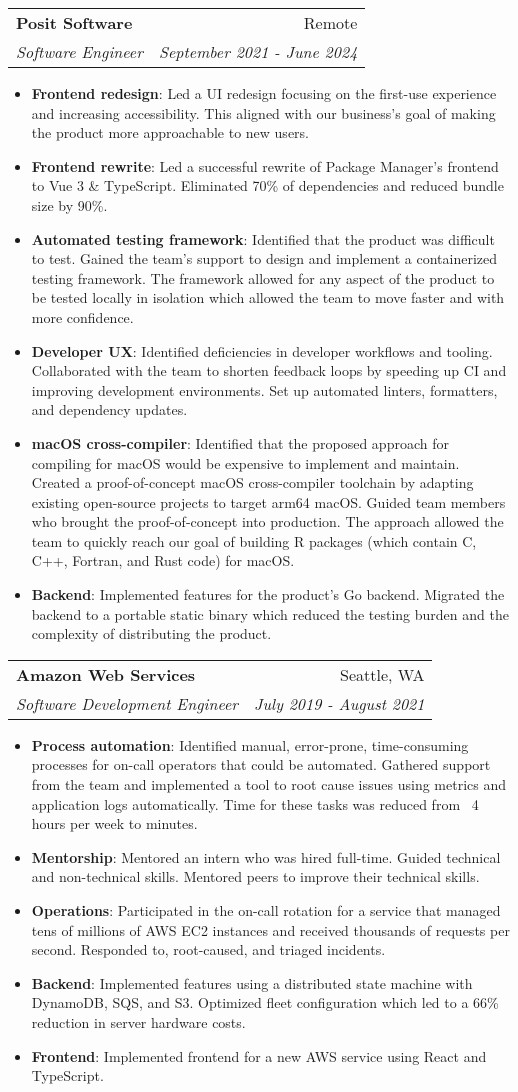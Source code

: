 \documentclass[letterpaper,11pt]{article}
\makeatletter
\newcommand{\resumeItem}[2]{
  \item\small{
    \textbf{#1}{: #2 \vspace{-2pt}}
  }
}
\newcommand{\resumeSubheading}[4]{
  \vspace{-1pt}\item
    \begin{tabular*}{0.97\textwidth}[t]{l@{\extracolsep{\fill}}r}
      \textbf{#1} & #2 \\
      \textit{\small#3} & \textit{\small #4} \\
    \end{tabular*}\vspace{-5pt}
}
\newcommand{\resumeItemListStart}{\begin{itemize}}
\newcommand{\resumeItemListEnd}{\end{itemize}\vspace{-5pt}}
\makeatother
\begin{document}
    \resumeSubheading
      {Posit Software}{Remote}
      {Software Engineer}{September 2021 - June 2024}
      \resumeItemListStart
        \resumeItem{Frontend redesign}{Led a UI redesign focusing on the first-use experience and increasing accessibility. This aligned with our business's goal of making the product more approachable to new users.}
        \resumeItem{Frontend rewrite}{Led a successful rewrite of Package Manager's frontend to Vue 3 \& TypeScript. Eliminated 70\% of dependencies and reduced bundle size by 90\%.}
        \resumeItem{Automated testing framework}{Identified that the product was difficult to test. Gained the team's support to design and implement a containerized testing framework. The framework allowed for any aspect of the product to be tested locally in isolation which allowed the team to move faster and with more confidence.}
        \resumeItem{Developer UX}{Identified deficiencies in developer workflows and tooling. Collaborated with the team to shorten feedback loops by speeding up CI and improving development environments. Set up automated linters, formatters, and dependency updates.}
        \resumeItem{macOS cross-compiler}{Identified that the proposed approach for compiling for macOS would be expensive to implement and maintain. Created a proof-of-concept macOS cross-compiler toolchain by adapting existing open-source projects to target arm64 macOS. Guided team members who brought the proof-of-concept into production. The approach allowed the team to quickly reach our goal of building R packages (which contain C, C++, Fortran, and Rust code) for macOS.}
        \resumeItem{Backend}{Implemented features for the product's Go backend. Migrated the backend to a portable static binary which reduced the testing burden and the complexity of distributing the product.}
      \resumeItemListEnd

    \resumeSubheading
      {Amazon Web Services}{Seattle, WA}
      {Software Development Engineer}{July 2019 - August 2021}
      \resumeItemListStart
        \resumeItem{Process automation}{Identified manual, error-prone, time-consuming processes for on-call operators that could be automated. Gathered support from the team and implemented a tool to root cause issues using metrics and application logs automatically. Time for these tasks was reduced from ~4 hours per week to minutes.}
        \resumeItem{Mentorship}{Mentored an intern who was hired full-time. Guided technical and non-technical skills. Mentored peers to improve their technical skills.}
        \resumeItem{Operations}{Participated in the on-call rotation for a service that managed tens of millions of AWS EC2 instances and received thousands of requests per second. Responded to, root-caused, and triaged incidents.}
        \resumeItem{Backend}{Implemented features using a distributed state machine with DynamoDB, SQS, and S3. Optimized fleet configuration which led to a 66\% reduction in server hardware costs.}
        \resumeItem{Frontend}{Implemented frontend for a new AWS service using React and TypeScript.}
        \resumeItemListEnd
\end{document}
